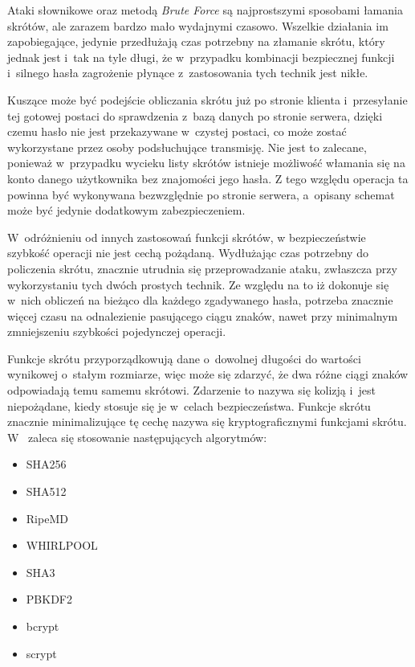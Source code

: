 \documentclass[11pt]{aghdpl}
\begin{document}
Ataki słownikowe oraz metodą \emph{Brute Force} są najprostszymi sposobami łamania skrótów, ale zarazem bardzo mało wydajnymi czasowo. Wszelkie działania im zapobiegające, jedynie przedłużają czas potrzebny na złamanie skrótu, który jednak jest i~tak na tyle długi, że w~przypadku kombinacji bezpiecznej funkcji i~silnego hasła zagrożenie płynące z~zastosowania tych technik jest nikłe.

Kuszące może być podejście obliczania skrótu już po stronie klienta i~przesyłanie tej gotowej postaci do sprawdzenia z~bazą danych po stronie serwera, dzięki czemu hasło nie jest przekazywane w~czystej postaci, co może zostać wykorzystane przez osoby podsłuchujące transmisję. Nie jest to zalecane, ponieważ w~przypadku wycieku listy skrótów istnieje możliwość włamania się na konto danego użytkownika bez znajomości jego hasła. Z tego względu operacja ta powinna być wykonywana bezwzględnie po stronie serwera, a~opisany schemat może być jedynie dodatkowym zabezpieczeniem.

W~odróżnieniu od innych zastosowań funkcji skrótów, w bezpieczeństwie szybkość operacji nie jest cechą pożądaną. Wydłużając czas potrzebny do policzenia skrótu, znacznie utrudnia się przeprowadzanie ataku, zwłaszcza przy wykorzystaniu tych dwóch prostych technik. Ze względu na to iż dokonuje się w~nich obliczeń na bieżąco dla każdego zgadywanego hasła, potrzeba znacznie więcej czasu na odnalezienie pasującego ciągu znaków, nawet przy minimalnym zmniejszeniu szybkości pojedynczej operacji.

Funkcje skrótu przyporządkowują dane o~dowolnej długości do wartości wynikowej o~stałym rozmiarze, więc może się zdarzyć, że dwa różne ciągi znaków odpowiadają temu samemu skrótowi. Zdarzenie to nazywa się kolizją i~jest niepożądane, kiedy stosuje się je w~celach bezpieczeństwa. Funkcje skrótu znacznie minimalizujące tę cechę nazywa się kryptograficznymi funkcjami skrótu. W~\cite{CSH} zaleca się stosowanie następujących algorytmów:

\begin{itemize}
\item SHA256
\item SHA512
\item RipeMD
\item WHIRLPOOL
\item SHA3
\item PBKDF2
\item bcrypt
\item scrypt		
\end{itemize}
\end{document}

